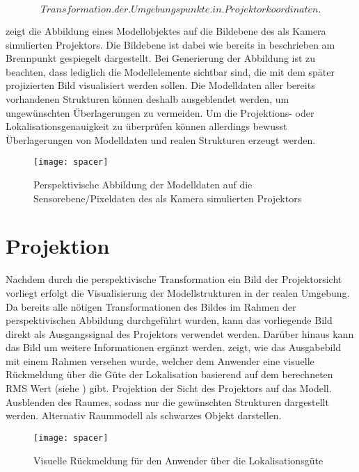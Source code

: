 \begin{equation}
Transformation. der. Umgebungspunkte. in. Projektorkoordinaten.
\end{equation} 

 zeigt die Abbildung eines Modellobjektes auf die Bildebene des als Kamera simulierten Projektors. Die Bildebene ist dabei wie bereits in  beschrieben am Brennpunkt gespiegelt dargestellt. Bei Generierung der Abbildung ist zu beachten, dass lediglich die Modellelemente sichtbar sind, die mit dem später projizierten Bild visualisiert werden sollen. Die Modelldaten aller bereits vorhandenen Strukturen können deshalb ausgeblendet werden, um ungewünschten Überlagerungen zu vermeiden. Um die Projektions- oder Lokalisationsgenauigkeit zu überprüfen können allerdings bewusst Überlagerungen von Modelldaten und realen Strukturen erzeugt werden.

\begin{figure}[!ht]
	\begin{center}
		\texttt{[image: spacer]}
		\caption{Perspektivische Abbildung der Modelldaten auf die Sensorebene/Pixeldaten des als Kamera simulierten Projektors}
		\label{fig.perspproj_vtk}
	\end{center}
\end{figure}


\section{Projektion}
Nachdem durch die perspektivische Transformation ein Bild der Projektorsicht vorliegt erfolgt die Visualisierung der Modellstrukturen in der realen Umgebung. Da bereits alle nötigen Transformationen des Bildes im Rahmen der perspektivischen Abbildung durchgeführt wurden, kann das vorliegende Bild direkt als Ausgangssignal des Projektors verwendet werden. Darüber hinaus kann das Bild um weitere Informationen ergänzt werden.  zeigt, wie das Ausgabebild mit einem Rahmen versehen wurde, welcher dem Anwender eine visuelle Rückmeldung über die Güte der Lokalisation basierend auf dem berechneten RMS Wert (siehe ) gibt.
Projektion der Sicht des Projektors auf das Modell. Ausblenden des Raumes, sodass nur die gewünschten Strukturen dargestellt werden. Alternativ Raummodell als schwarzes Objekt darstellen.

\begin{figure}[!ht]
	\begin{center}
		\texttt{[image: spacer]}
		\caption{Visuelle Rückmeldung für den Anwender über die Lokalisationsgüte}
		\label{fig.proj_rms}
	\end{center}
\end{figure}